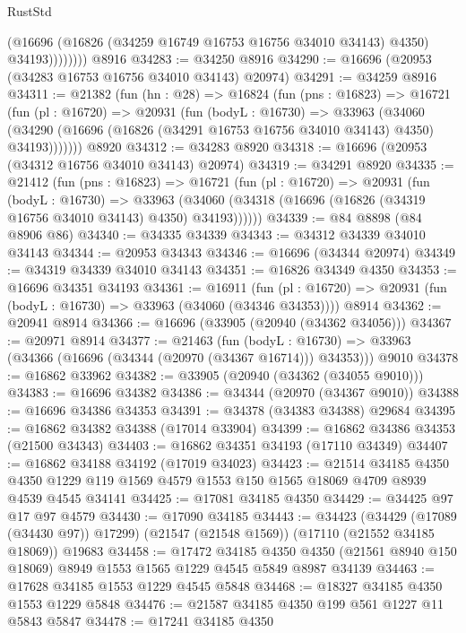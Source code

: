 \begin{lexlean}{RustStd}
\begin{coremodule}
                  (@16696 (@16826 (@34259 @16749 @16753 @16756 @34010 @34143) @4350) @34193))))))))
    @8916
@34283 := @34250 @8916
@34290 := @16696 (@20953 (@34283 @16753 @16756 @34010 @34143) @20974)
@34291 := @34259 @8916
@34311 := @21382
    (fun (hn : @28) =>
    @16824
      (fun (pns : @16823) =>
      @16721
        (fun (pl : @16720) =>
        @20931
          (fun (bodyL : @16730) =>
          @33963
            (@34060
              (@34290 (@16696 (@16826 (@34291 @16753 @16756 @34010 @34143) @4350) @34193)))))))
    @8920
@34312 := @34283 @8920
@34318 := @16696 (@20953 (@34312 @16756 @34010 @34143) @20974)
@34319 := @34291 @8920
@34335 := @21412
    (fun (pns : @16823) =>
    @16721
      (fun (pl : @16720) =>
      @20931
        (fun (bodyL : @16730) =>
        @33963 (@34060 (@34318 (@16696 (@16826 (@34319 @16756 @34010 @34143) @4350) @34193))))))
@34339 := @84 @8898 (@84 @8906 @86)
@34340 := @34335 @34339
@34343 := @34312 @34339 @34010 @34143
@34344 := @20953 @34343
@34346 := @16696 (@34344 @20974)
@34349 := @34319 @34339 @34010 @34143
@34351 := @16826 @34349 @4350
@34353 := @16696 @34351 @34193
@34361 := @16911
    (fun (pl : @16720) => @20931 (fun (bodyL : @16730) => @33963 (@34060 (@34346 @34353))))
    @8914
@34362 := @20941 @8914
@34366 := @16696 (@33905 (@20940 (@34362 @34056)))
@34367 := @20971 @8914
@34377 := @21463
    (fun (bodyL : @16730) => @33963 (@34366 (@16696 (@34344 (@20970 (@34367 @16714))) @34353)))
    @9010
@34378 := @16862 @33962
@34382 := @33905 (@20940 (@34362 (@34055 @9010)))
@34383 := @16696 @34382
@34386 := @34344 (@20970 (@34367 @9010))
@34388 := @16696 @34386 @34353
@34391 := @34378 (@34383 @34388) @29684
@34395 := @16862 @34382 @34388 (@17014 @33904)
@34399 := @16862 @34386 @34353 (@21500 @34343)
@34403 := @16862 @34351 @34193 (@17110 @34349)
@34407 := @16862 @34188 @34192 (@17019 @34023)
@34423 := @21514
    @34185
    @4350
    @4350
    @1229
    @119
    @1569
    @4579
    @1553
    @150
    @1565
    @18069
    @4709
    @8939
    @4539
    @4545
    @34141
@34425 := @17081 @34185 @4350
@34429 := @34425 @97 @17 @97 @4579
@34430 := @17090 @34185
@34443 := @34423
    (@34429 (@17089 (@34430 @97)) @17299)
    (@21547 (@21548 @1569))
    (@17110 (@21552 @34185 @18069))
    @19683
@34458 := @17472
    @34185
    @4350
    @4350
    (@21561 @8940 @150 @18069)
    @8949
    @1553
    @1565
    @1229
    @4545
    @5849
    @8987
    @34139
@34463 := @17628 @34185 @1553 @1229 @4545 @5848
@34468 := @18327 @34185 @4350 @1553 @1229 @5848
@34476 := @21587 @34185 @4350 @199 @561 @1227 @11 @5843 @5847
@34478 := @17241 @34185 @4350

\end{coremodule}
\end{lexlean}
